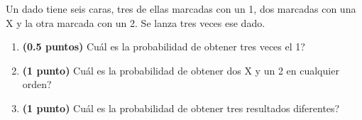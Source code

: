 
Un dado tiene seis caras, tres de ellas marcadas con un 1, dos marcadas con una X y la otra marcada con un 2. Se lanza tres veces ese dado.
\begin{enumerate}[label=\alph*)]
\item \textbf{(0.5 puntos)} \textquestiondown{}Cuál es la probabilidad de obtener tres veces el 1?
\item \textbf{(1 punto)} \textquestiondown{}Cuál es la probabilidad de obtener dos X y un 2 en cualquier orden?
\item \textbf{(1 punto)} \textquestiondown{}Cuál es la probabilidad de obtener tres resultados diferentes?
\end{enumerate}
